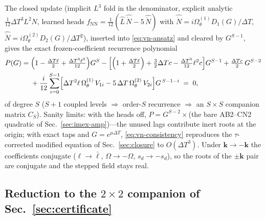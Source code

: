 \documentclass[11pt]{article}
\theoremstyle{plain}
\theoremstyle{definition}
\newcommand{\DT}{\Delta T}
\begin{document}
The closed update (implicit $L^3$ fold in the denominator, explicit
analytic $\tfrac{1}{12}\DT^3 L^2N$, learned heads
$f_{\mathrm{NN}}=\tfrac{1}{12}(\hat L\,\widehat{\dot N}
-5\,\widehat{\ddot N})$ with
$\widehat{\dot N}=i\Omega^{(1)}_\theta D_1(G)/\DT$,
$\widehat{\ddot N}=i\Omega^{(2)}_\theta D_2(G)/\DT^{2}$), inserted into
\eqref{eq:vn-ansatz} and cleared by $G^{S-1}$, gives the exact
frozen-coefficient recurrence polynomial
\begin{equation}
\begin{aligned}
P(G)=\;&\Bigl(1-\tfrac{\DT\ell}{2}+\tfrac{\DT^{3}\ell^{3}}{12}\Bigr)G^{S}
-\Bigl[\Bigl(1+\tfrac{\DT\ell}{2}\Bigr)+\tfrac{3}{2}\DT c
-\tfrac{\DT^{3}}{12}\ell^{2}c\Bigr]G^{S-1}
+\tfrac{\DT c}{2}\,G^{S-2}\\
&+\frac{i}{12}\sum_{i=0}^{S-1}
\Bigl[\DT^{2}\ell\,\Omega^{(1)}_{\theta}\,V_{1i}
-5\,\DT\,\Omega^{(2)}_{\theta}\,V_{2i}\Bigr]G^{\,S-1-i}\;=\;0,
\end{aligned}
\label{eq:vn-charpoly}
\end{equation}
of degree $S$ ($S{+}1$ coupled levels $\Rightarrow$ order-$S$
recurrence $\Rightarrow$ an $S\times S$ companion matrix
$C_S$). Sanity limits: with the heads off,
$P=G^{S-2}\times$(the bare AB2--CN2 quadratic of Sec.~\ref{sec:imex-amp})---the unused
lags contribute inert roots at the origin; with exact taps and
$G=e^{\mu\DT}$, \eqref{eq:vn-consistency} reproduces the
$\tau$-corrected modified equation of Sec.~\ref{sec:closure} to $O(\DT^{3})$. Under
$\mathbf{k}\to-\mathbf{k}$ the coefficients conjugate
($\ell\to\bar\ell$, $\Omega\to-\Omega$, $s_d\to-s_d$), so the roots of
the $\pm\mathbf{k}$ pair are conjugate and the stepped field stays real.

\subsection{Reduction to the $2\times2$ companion of Sec.~\ref{sec:certificate}}
\end{document}
